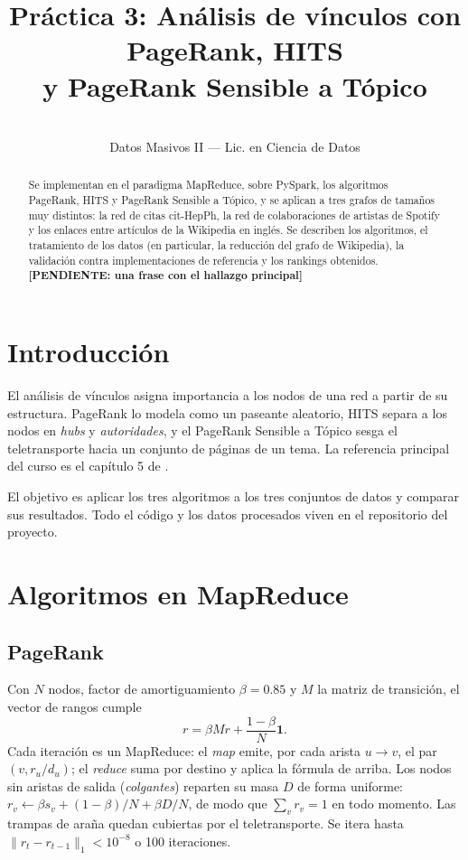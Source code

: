 \documentclass[11pt,a4paper]{article}
\title{Práctica 3: Análisis de vínculos con PageRank, HITS\\y PageRank Sensible a Tópico}
\author{\pend{nombre del alumno}\\Datos Masivos II --- Lic. en Ciencia de Datos}
\date{\pend{fecha de entrega}}
\newcommand{\pend}[1]{\textcolor{red!70!black}{\textbf{[PENDIENTE: #1]}}}
\begin{document}
\maketitle

\begin{abstract}
Se implementan en el paradigma MapReduce, sobre PySpark, los algoritmos PageRank, HITS y PageRank Sensible a Tópico, y se aplican a tres grafos de tamaños muy distintos: la red de citas cit-HepPh, la red de colaboraciones de artistas de Spotify y los enlaces entre artículos de la Wikipedia en inglés. Se describen los algoritmos, el tratamiento de los datos (en particular, la reducción del grafo de Wikipedia), la validación contra implementaciones de referencia y los rankings obtenidos. \pend{una frase con el hallazgo principal}
\end{abstract}

\section{Introducción}
El análisis de vínculos asigna importancia a los nodos de una red a partir de su estructura. PageRank \cite{page1999pagerank} lo modela como un paseante aleatorio, HITS \cite{kleinberg1999hits} separa a los nodos en \emph{hubs} y \emph{autoridades}, y el PageRank Sensible a Tópico \cite{haveliwala2002topic} sesga el teletransporte hacia un conjunto de páginas de un tema. La referencia principal del curso es el capítulo 5 de \cite{leskovec2016mining}.

El objetivo es aplicar los tres algoritmos a los tres conjuntos de datos y comparar sus resultados. Todo el código y los datos procesados viven en el repositorio del proyecto.

\section{Algoritmos en MapReduce}
\subsection{PageRank}
Con $N$ nodos, factor de amortiguamiento $\beta=0.85$ y $M$ la matriz de transición, el vector de rangos cumple
\begin{equation}
  r = \beta M r + \frac{1-\beta}{N}\mathbf{1}.
\end{equation}
Cada iteración es un MapReduce: el \emph{map} emite, por cada arista $u\to v$, el par $(v, r_u/d_u)$; el \emph{reduce} suma por destino y aplica la fórmula de arriba. Los nodos sin aristas de salida (\emph{colgantes}) reparten su masa $D$ de forma uniforme: $r_v \leftarrow \beta s_v + (1-\beta)/N + \beta D/N$, de modo que $\sum_v r_v = 1$ en todo momento. Las trampas de araña quedan cubiertas por el teletransporte. Se itera hasta $\lVert r_t - r_{t-1}\rVert_1 < 10^{-8}$ o 100 iteraciones.
\end{document}
